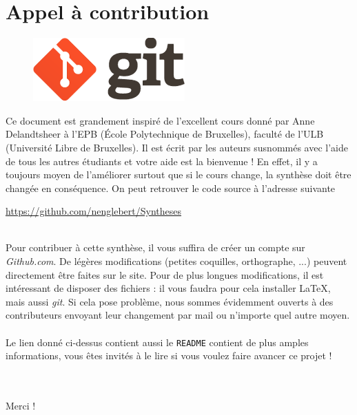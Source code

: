 \chapter*{Appel à contribution}
\begin{figure}
\includegraphics[scale=0.5]{git.png}
\end{figure}
Ce document est grandement inspiré de l’excellent cours donné 
par Anne Delandtsheer à l’EPB (École Polytechnique de Bruxelles), faculté de l’ULB (Université 
Libre de Bruxelles). Il est écrit par les auteurs susnommés avec l’aide de tous les autres étudiants 
et votre aide est la bienvenue ! En effet, il y a toujours moyen de l’améliorer surtout que si le 
cours change, la synthèse doit être changée en conséquence. On peut retrouver le code source à l’adresse 
suivante
\begin{center}
\url{https://github.com/nenglebert/Syntheses}
\end{center}\ \\
Pour contribuer à cette synthèse, il vous suffira de créer un compte sur \textit{Github.com}. De
légères modifications (petites coquilles, orthographe, ...) peuvent directement être faites sur le
site. Pour de plus longues modifications, il est intéressant de disposer des fichiers : il vous 
faudra pour cela installer \LaTeX, mais aussi \textit{git}. Si cela pose problème, nous sommes 
évidemment ouverts à des contributeurs envoyant leur changement par mail ou n’importe quel autre 
moyen.\\
\\
Le lien donné ci-dessus contient aussi le \texttt{README} contient de plus amples informations, 
vous êtes invités à le lire si vous voulez faire avancer ce projet ! \\
\\
\\
\begin{flushright}
Merci ! 
\end{flushright}